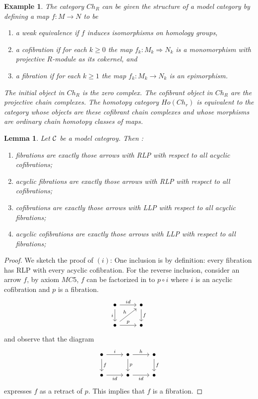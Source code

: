 \documentclass[11pt]{article}
\newtheorem{lemma}[thm]{Lemma}
\newtheorem{ex}[thm]{Example}
\newcommand{\calc}{{\cal C}}
\newcommand{\Lrta}{\Longrightarrow}
\newcommand{\lrta}{\longrightarrow}
\begin{document}
\begin{ex}
The category $Ch_R$ can be given the structure of a model category by defining a map $f: M\lrta N$ to be 
\begin{enumerate}[label=(\roman*)]
\item a weak equivalence if $f$ induces isomorphisms on homology groups,
\item a cofibration if for each $k\geq 0$ the map $f_k:M_k\Lrta N_k$ is a monomorphism with projective $R$-module as its cokernel, and
\item a fibration if for each $k\geq 1$ the map $f_k: M_k\lrta N_k$ is an epimorphism.
\end{enumerate} The initial object in $Ch_R$ is the zero complex. 
The cofibrant object in $Ch_R$ are the projective chain complexes. The homotopy category $Ho(Ch_r)$ is equivalent to the category whose objects are these cofibrant chain complexes and whose morphisms are ordinary chain homotopy classes of maps.
\end{ex}

\begin{lemma}
Let $\calc$ be a model categroy. Then :
\begin{enumerate}[label=(\roman*)]
\item fibrations are exactly those arrows with RLP with respect to all acyclic cofibrations;
\item acyclic fibrations are exactly those arrows with RLP with respect to all cofibrations;
\item  cofibrations are exactly those arrows with LLP with respect to all acyclic fibrations;
\item acyclic cofibrations are exactly those arrows with LLP with respect to all fibrations;
 \end{enumerate}
\end{lemma}
\begin{proof}
We sketch the proof of $(i)$: One inclusion is by definition: every fibration has RLP with every acyclic cofibration. For the reverse inclusion, consider an arrow $f$, by axiom $MC5$, $f$ can be factorized in to $p\circ i$ where $i$ is an acyclic cofibration and $p$ is a fibration. 
$$
\begin{tikzcd}
\bullet \arrow[d, "i"'] \arrow[r, "id"] & \bullet \arrow[d, "f"] \\
\bullet \arrow[r, "p"] \arrow[ru, "h"] & \bullet
\end{tikzcd}
$$
and observe that the diagram 
$$
\begin{tikzcd}
\bullet \arrow[r, "i"] \arrow[d, "f"] & \bullet \arrow[r, "h"] \arrow[d, "p"] & \bullet \arrow[d, "f"] \\
\bullet \arrow[r, "id"'] & \bullet \arrow[r, "id"'] & \bullet
\end{tikzcd}
$$
expresses $f$ as a retract of $p$. This implies that $f$ is a fibration.
\end{proof}
\end{document}
